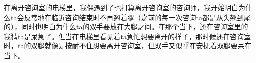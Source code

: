 在离开咨询室的电梯里，我偶遇到了也打算离开咨询室的咨询师，我开始明白为什么ta会反常地在临近咨询结束时不再翘着腿（之前的每一次咨询ta都是从头翘到尾的），同时也明白为什么ta的双手要放在大腿之间。在那个当下，还在咨询室里的我猜ta是尿急了。但当在电梯里看见着ta急忙想要离开的样子，那时候还在咨询室时，ta的双腿就像是按耐不住想要离开咨询室，但双手又似乎在安抚着双腿\pozhehao{}要呆在当下。

